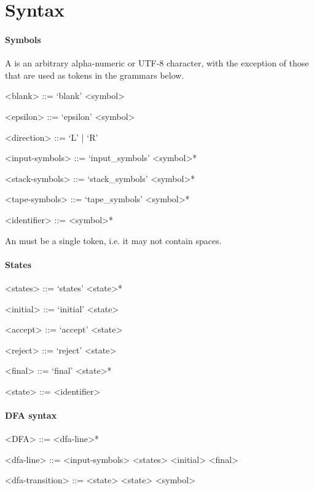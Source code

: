 \documentclass[11pt]{article}
\begin{document}
\clearpage

\section{Syntax}

\setlength{\grammarindent}{6em}

\paragraph{Symbols}
A  is an arbitrary alpha-numeric or UTF-8 character, with the exception of those that are used as tokens in the grammars below.

\begin{grammar}
<blank> ::= `blank' <symbol>

<epsilon> ::= `epsilon' <symbol>

<direction> ::= `L' | `R'

<input-symbols> ::= `input_symbols' <symbol>*

<stack-symbols> ::= `stack_symbols' <symbol>*

<tape-symbols> ::= `tape_symbols' <symbol>*

<identifier> ::= <symbol>*
\end{grammar}

An  must be a single token, i.e. it may not contain spaces.

\paragraph{States}
\begin{grammar}
<states> ::= `states' <state>*

<initial> ::= `initial' <state>

<accept> ::= `accept' <state>

<reject> ::= `reject' <state>

<final> ::= `final' <state>*

<state> ::= <identifier>
\end{grammar}

\paragraph{DFA syntax}
\begin{grammar}
<DFA> ::= <dfa-line>*

<dfa-line> ::= <input-symbols> 
  \alt <states>
  \alt <initial> 
  \alt <final> 

<dfa-transition> ::= <state> <state> <symbol>
\end{grammar}
\end{document}
